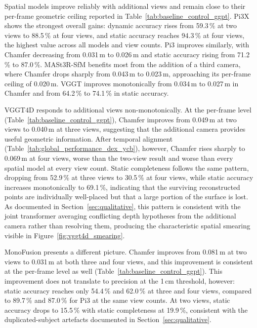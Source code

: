 Spatial models improve reliably with additional views and remain close to
their per-frame geometric ceiling reported in
Table~\ref{tab:baseline_control_ggpt}. Pi3X shows the strongest overall
gains: dynamic accuracy rises from 59.3\,\% at two views to 88.5\,\% at
four views, and static accuracy reaches 94.3\,\% at four views, the highest
value across all models and view counts. Pi3 improves similarly, with Chamfer
decreasing from 0.031\,m to 0.026\,m and static accuracy rising from 71.2\,\%
to 87.0\,\%. MASt3R-SfM benefits most from the addition of a third camera,
where Chamfer drops sharply from 0.043\,m to 0.023\,m, approaching its
per-frame ceiling of 0.020\,m. VGGT improves monotonically from 0.034\,m
to 0.027\,m in Chamfer and from 64.2\,\% to 74.1\,\% in static accuracy.

VGGT4D responds to additional views non-monotonically. At the per-frame
level (Table~\ref{tab:baseline_control_ggpt}), Chamfer improves from
0.049\,m at two views to 0.040\,m at three views, suggesting that the
additional camera provides useful geometric information. After temporal
alignment (Table~\ref{tab:global_performance_dex_ycb}), however, Chamfer
rises sharply to 0.069\,m at four views, worse than the two-view result
and worse than every spatial model at every view count. Static completeness
follows the same pattern, dropping from 52.9\,\% at three views to 30.5\,\%
at four views, while static accuracy increases monotonically to 69.1\,\%,
indicating that the surviving reconstructed points are individually
well-placed but that a large portion of the surface is lost. As documented
in Section~\ref{sec:qualitative}, this pattern is consistent with the joint
transformer averaging conflicting depth hypotheses from the additional camera
rather than resolving them, producing the characteristic spatial smearing
visible in Figure~\ref{fig:vggt4d_smearing}.

MonoFusion presents a different picture. Chamfer improves from 0.081\,m at
two views to 0.031\,m at both three and four views, and this improvement is
consistent at the per-frame level as well (Table~\ref{tab:baseline_control_ggpt}).
This improvement does not translate to precision at the 1\,cm threshold,
however: static accuracy reaches only 54.4\,\% and 62.0\,\% at three and
four views, compared to 89.7\,\% and 87.0\,\% for Pi3 at the same view
counts. At two views, static accuracy drops to 15.5\,\% with static
completeness at 19.9\,\%, consistent with the duplicated-subject artefacts
documented in Section~\ref{sec:qualitative}.


